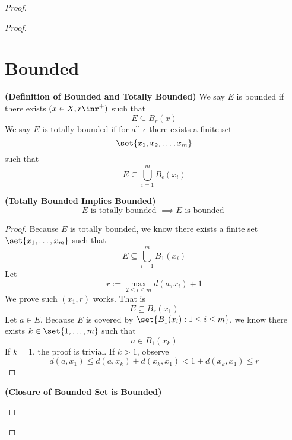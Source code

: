 \documentclass{report}
\begin{document}
\begin{proof}
\begin{proof}
\section{Bounded}
\begin{definition}
\label{3.5.1}
\textbf{(Definition of Bounded and Totally Bounded)} We say $E$ is bounded if there exists $(x\in X,r\inr^+)$ such that 
\begin{equation*}
E\subseteq B_r(x)
\end{equation*}
We say $E$ is totally bounded if for all $\epsilon $ there exists a finite set 
\begin{equation*}
\set{x_1,x_2,\dots ,x_m}
\end{equation*}
such that 
\begin{equation*}
E\subseteq \bigcup_{i=1}^m B_{\epsilon }(x_i)
\end{equation*}
\end{definition}
\begin{theorem}
\label{3.5.2}
\textbf{(Totally Bounded Implies Bounded)} 
\begin{equation*}
E\text{ is totally bounded }\implies E\text{ is bounded }
\end{equation*}
\end{theorem}
\begin{proof}
Because $E$ is totally bounded, we know there exists a finite set $\set{x_1,\dots ,x_m}$ such that 
\begin{equation*}
E\subseteq \bigcup_{i=1}^m B_1(x_i)
\end{equation*}
Let
\begin{equation*}
r:=\max_{2\leq i\leq m} d(a,x_i)+1
\end{equation*}
We prove such $(x_1,r)$ works. That is  
\begin{equation*}
E\subseteq B_r(x_1)
\end{equation*}
Let $a\in E$. Because $E$ is covered by $\set{B_1(x_i):1\leq i\leq m}$, we know there exists $k\in \set{1,\dots ,m}$ such that 
\begin{equation*}
a \in B_1(x_k)
\end{equation*}
If $k=1$, the proof is trivial. If  $k>1$, observe
\begin{equation*}
  d(a,x_1)\leq d(a,x_k)+d(x_k,x_1)<1+d(x_k,x_1)\leq r
\end{equation*}
\end{proof}
\begin{theorem}
\label{3.5.3}
\textbf{(Closure of Bounded Set is Bounded)} 
\begin{equation*}

\end{equation*}
\end{theorem}
\end{proof}
\end{proof}
\end{document}
